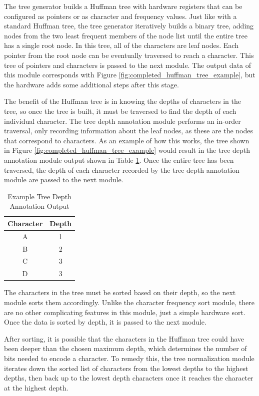 \documentclass[doublespace,nopageskip]{VTthesis}
\begin{document}
The tree generator builds a Huffman tree with hardware registers that can be configured as pointers or as character and frequency values. Just like with a standard Huffman tree, the tree generator iteratively builds a binary tree, adding nodes from the two least frequent members of the node list until the entire tree has a single root node. In this tree, all of the characters are leaf nodes. Each pointer from the root node can be eventually traversed  to reach a character. This tree of pointers and characters is passed to the next module. The output data of this module corresponds with Figure \ref{fig:completed_huffman_tree_example}, but the hardware adds some additional steps after this stage.

The benefit of the Huffman tree is in knowing the depths of characters in the tree, so once the tree is built, it must be traversed to find the depth of each individual character. The tree depth annotation module performs an in-order traversal, only recording information about the leaf nodes, as these are the nodes that correspond to characters. As an example of how this works, the tree shown in Figure \ref{fig:completed_huffman_tree_example} would result in the tree depth annotation module output shown in Table \ref{tab:tree_depth_annotation_output}. Once the entire tree has been traversed, the depth of each character recorded by the tree depth annotation module are passed to the next module.

\begin{table}[htb]
	\centering
	\caption{Example Tree Depth Annotation Output}
	\begin{tabular}{cc}
	    \toprule
	    Character & Depth \\
	    \midrule
	    A & 1 \\
	    \midrule
	    B & 2 \\
	    \midrule
	    C & 3 \\
	    \midrule
	    D & 3 \\
	    \bottomrule
	\end{tabular}
	\label{tab:tree_depth_annotation_output}
\end{table}

The characters in the tree must be sorted based on their depth, so the next module sorts them accordingly. Unlike the character frequency sort module, there are no other complicating features in this module, just a simple hardware sort. Once the data is sorted by depth, it is passed to the next module.

After sorting, it is possible that the characters in the Huffman tree could have been deeper than the chosen maximum depth, which determines the number of bits needed to encode a character. To remedy this, the tree normalization module iterates down the sorted list of characters from the lowest depths to the highest depths, then back up to the lowest depth characters once it reaches the character at the highest depth.
\end{document}
